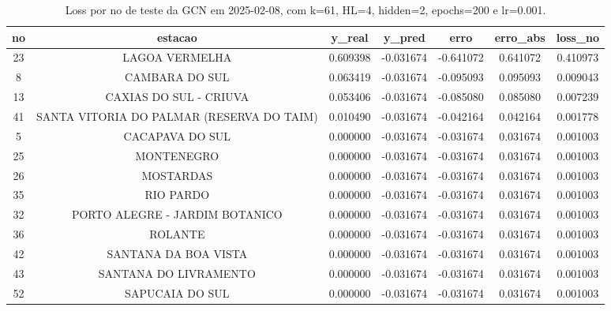 \begin{table}[h]
\centering
\caption{Loss por no de teste da GCN em 2025-02-08, com k=61, HL=4, hidden=2, epochs=200 e lr=0.001.}
\label{tab:gcn_loss_k61_hl4_h2_e200_d20250208}
\begin{tabular}{ccccccc}
\toprule
no & estacao & y\_real & y\_pred & erro & erro\_abs & loss\_no \\
\midrule
23 & LAGOA VERMELHA & 0.609398 & -0.031674 & -0.641072 & 0.641072 & 0.410973 \\
8 & CAMBARA DO SUL & 0.063419 & -0.031674 & -0.095093 & 0.095093 & 0.009043 \\
13 & CAXIAS DO SUL - CRIUVA & 0.053406 & -0.031674 & -0.085080 & 0.085080 & 0.007239 \\
41 & SANTA VITORIA DO PALMAR (RESERVA DO TAIM) & 0.010490 & -0.031674 & -0.042164 & 0.042164 & 0.001778 \\
5 & CACAPAVA DO SUL & 0.000000 & -0.031674 & -0.031674 & 0.031674 & 0.001003 \\
25 & MONTENEGRO & 0.000000 & -0.031674 & -0.031674 & 0.031674 & 0.001003 \\
26 & MOSTARDAS & 0.000000 & -0.031674 & -0.031674 & 0.031674 & 0.001003 \\
35 & RIO PARDO & 0.000000 & -0.031674 & -0.031674 & 0.031674 & 0.001003 \\
32 & PORTO ALEGRE - JARDIM BOTANICO & 0.000000 & -0.031674 & -0.031674 & 0.031674 & 0.001003 \\
36 & ROLANTE & 0.000000 & -0.031674 & -0.031674 & 0.031674 & 0.001003 \\
42 & SANTANA DA BOA VISTA & 0.000000 & -0.031674 & -0.031674 & 0.031674 & 0.001003 \\
43 & SANTANA DO LIVRAMENTO & 0.000000 & -0.031674 & -0.031674 & 0.031674 & 0.001003 \\
52 & SAPUCAIA DO SUL & 0.000000 & -0.031674 & -0.031674 & 0.031674 & 0.001003 \\
\bottomrule
\end{tabular}
\end{table}
